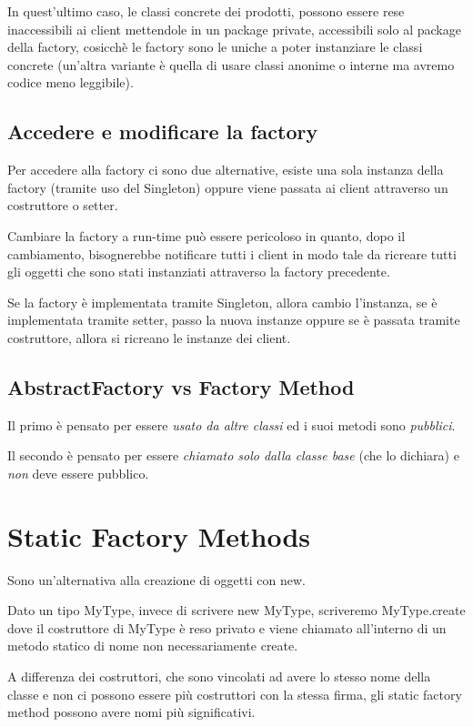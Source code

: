 In quest'ultimo caso, le classi concrete dei prodotti, possono essere rese inaccessibili ai client mettendole in un package private, accessibili solo al package della
factory, cosicchè le factory sono le uniche a poter instanziare le classi concrete (un'altra variante è quella di usare classi anonime o interne ma avremo codice meno
leggibile).

\subsection{Accedere e modificare la factory}

Per accedere alla factory ci sono due alternative, esiste una sola instanza della factory (tramite uso del Singleton) oppure viene passata ai client attraverso un 
costruttore o setter.

Cambiare la factory a run-time può essere pericoloso in quanto, dopo il cambiamento, bisognerebbe notificare tutti i client in modo tale da ricreare tutti gli oggetti 
che sono stati instanziati attraverso la factory precedente.

Se la factory è implementata tramite Singleton, allora cambio l'instanza, se è implementata tramite setter, passo la nuova instanze oppure se è passata tramite 
costruttore, allora si ricreano le instanze dei client.

\subsection{AbstractFactory vs Factory Method}

Il primo è pensato per essere \textit{usato da altre classi} ed i suoi metodi sono \textit{pubblici}.

Il secondo è pensato per essere \textit{chiamato solo dalla classe base} (che lo dichiara) e \textit{non} deve essere pubblico.

\section{Static Factory Methods}

Sono un'alternativa alla creazione di oggetti con new.

Dato un tipo MyType, invece di scrivere new MyType, scriveremo MyType.create dove il costruttore di MyType è reso privato e viene chiamato all'interno di un metodo 
statico di nome non necessariamente create.

A differenza dei costruttori, che sono vincolati ad avere lo stesso nome della classe e non ci possono essere più costruttori con la stessa firma, gli static factory 
method possono avere nomi più significativi.

